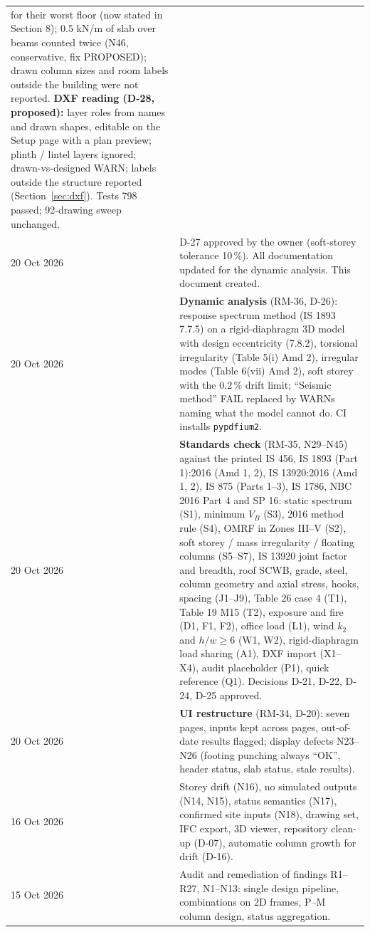 \documentclass[10pt,a4paper]{article}
\newcommand{\code}[1]{\texttt{\small #1}}
\begin{document}
\begin{longtable}{L{22mm}L{142mm}}
for their worst floor (now stated in Section 8); 0.5 kN/m of slab over beams counted twice (N46, conservative, fix
PROPOSED); drawn column sizes and room labels outside the building were not reported. \textbf{DXF reading (D-28,
proposed):} layer roles from names and drawn shapes, editable on the Setup page with a plan preview; plinth / lintel
layers ignored; drawn-vs-designed WARN; labels outside the structure reported (Section~\ref{sec:dxf}). Tests 798
passed; 92-drawing sweep unchanged. \\
20 Oct 2026 & D-27 approved by the owner (soft-storey tolerance 10\,\%). All documentation updated for the dynamic
analysis. This document created. \\
20 Oct 2026 & \textbf{Dynamic analysis} (RM-36, D-26): response spectrum method (IS 1893 7.7.5) on a rigid-diaphragm 3D
model with design eccentricity (7.8.2), torsional irregularity (Table 5(i) Amd 2), irregular modes (Table 6(vii)
Amd 2), soft storey with the 0.2\,\% drift limit; ``Seismic method'' FAIL replaced by WARNs naming what the model
cannot do. CI installs \code{pypdfium2}. \\
20 Oct 2026 & \textbf{Standards check} (RM-35, N29--N45) against the printed IS 456, IS 1893 (Part 1):2016 (Amd 1, 2),
IS 13920:2016 (Amd 1, 2), IS 875 (Parts 1--3), IS 1786, NBC 2016 Part 4 and SP 16: static spectrum (S1), minimum
$V_B$ (S3), 2016 method rule (S4), OMRF in Zones III--V (S2), soft storey / mass irregularity / floating columns
(S5--S7), IS 13920 joint factor and breadth, roof SCWB, grade, steel, column geometry and axial stress, hooks, spacing
(J1--J9), Table 26 case 4 (T1), Table 19 M15 (T2), exposure and fire (D1, F1, F2), office load (L1), wind $k_2$ and
$h/w\ge 6$ (W1, W2), rigid-diaphragm load sharing (A1), DXF import (X1--X4), audit placeholder (P1), quick reference
(Q1). Decisions D-21, D-22, D-24, D-25 approved. \\
20 Oct 2026 & \textbf{UI restructure} (RM-34, D-20): seven pages, inputs kept across pages, out-of-date results
flagged; display defects N23--N26 (footing punching always ``OK'', header status, slab status, stale results). \\
16 Oct 2026 & Storey drift (N16), no simulated outputs (N14, N15), status semantics (N17), confirmed site inputs
(N18), drawing set, IFC export, 3D viewer, repository clean-up (D-07), automatic column growth for drift (D-16). \\
15 Oct 2026 & Audit and remediation of findings R1--R27, N1--N13: single design pipeline, combinations on 2D frames,
P--M column design, status aggregation. \\
\bottomrule
\end{longtable}
\end{document}
